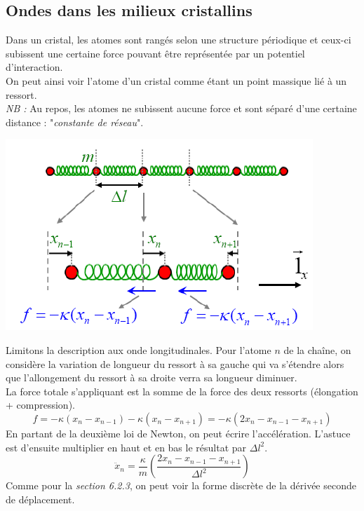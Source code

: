\documentclass	[11pt, a4paper, openany]{book}
\begin{document}
		\subsection{Ondes dans les milieux cristallins}
		Dans un cristal, les atomes sont rangés selon une structure périodique et ceux-ci subissent une certaine force pouvant être représentée par un potentiel d'interaction.\\
		On peut ainsi voir l'atome d'un cristal comme étant un point massique lié à un ressort.\\
		\textit{NB :} Au repos, les atomes ne subissent aucune force et sont séparé d'une certaine distance : "\textit{constante de réseau}".
		\begin{center}
			\includegraphics[scale=0.4]{oo/image26.png}
		\end{center}
		Limitons la description aux onde longitudinales. Pour l'atome $n$ de la chaîne, on considère la variation de longueur du ressort à sa gauche qui va s'étendre alors que l'allongement du ressort à sa droite verra sa longueur diminuer. \\
		La force totale s'appliquant est la somme de la force des deux ressorts (élongation + compression).
		\begin{equation}
			f = -\kappa(x_n - x_{n-1}) - \kappa(x_n - x_{n+1}) = -\kappa(2x_n - x_{n-1} - x_{n+1})
		\end{equation}
		En partant de la deuxième loi de Newton, on peut écrire l'accélération. L'astuce est d'ensuite multiplier en haut et en bas le résultat par $\Delta l^2$.
		\begin{equation}
			\ddot{x}_n = \frac{\kappa}{m}\left( \frac{2x_n - x_{n-1} - x_{n+1}}{\Delta l^2} \right)
		\end{equation}
		Comme pour la \textit{section 6.2.3}, on peut voir la forme discrète de la dérivée seconde de déplacement.
\end{document}
